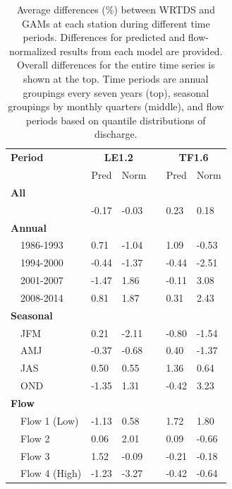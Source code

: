 \documentclass[letterpaper,12pt,oneside]{article}\usepackage[]{graphicx}\usepackage[]{color}
\begin{document}
\begin{table}[!tbp]
\caption{Average differences (\%) between \ac{WRTDS} and \acp{GAM} at each station during different time periods.  Differences for predicted and flow-normalized results from each model are provided.  Overall differences for the entire time series is shown at the top.  Time periods are annual groupings every seven years (top), seasonal groupings by monthly quarters (middle), and flow periods based on quantile distributions of discharge.\label{tab:avediff}} 
\begin{center}
\begin{tabular}{lllcll}
\hline\hline
\multicolumn{1}{l}{\bfseries Period}&\multicolumn{2}{c}{\bfseries LE1.2}&\multicolumn{1}{c}{\bfseries }&\multicolumn{2}{c}{\bfseries TF1.6}\tabularnewline
\cline{2-3} \cline{5-6}
\multicolumn{1}{l}{}&\multicolumn{1}{c}{Pred}&\multicolumn{1}{c}{Norm}&\multicolumn{1}{c}{}&\multicolumn{1}{c}{Pred}&\multicolumn{1}{c}{Norm}\tabularnewline
\hline
{\bfseries All}&&&&&\tabularnewline
~~&-0.17&-0.03&& 0.23& 0.18\tabularnewline
\hline
{\bfseries Annual}&&&&&\tabularnewline
~~1986-1993& 0.71&-1.04&& 1.09&-0.53\tabularnewline
~~1994-2000&-0.44&-1.37&&-0.44&-2.51\tabularnewline
~~2001-2007&-1.47& 1.86&&-0.11& 3.08\tabularnewline
~~2008-2014& 0.81& 1.87&& 0.31& 2.43\tabularnewline
\hline
{\bfseries Seasonal}&&&&&\tabularnewline
~~JFM& 0.21&-2.11&&-0.80&-1.54\tabularnewline
~~AMJ&-0.37&-0.68&& 0.40&-1.37\tabularnewline
~~JAS& 0.50& 0.55&& 1.36& 0.64\tabularnewline
~~OND&-1.35& 1.31&&-0.42& 3.23\tabularnewline
\hline
{\bfseries Flow}&&&&&\tabularnewline
~~Flow 1 (Low)&-1.13& 0.58&& 1.72& 1.80\tabularnewline
~~Flow 2& 0.06& 2.01&& 0.09&-0.66\tabularnewline
~~Flow 3& 1.52&-0.09&&-0.21&-0.18\tabularnewline
~~Flow 4 (High)&-1.23&-3.27&&-0.42&-0.64\tabularnewline
\hline
\end{tabular}\end{center}

\end{table}
\end{document}
